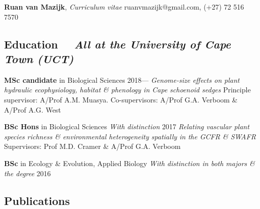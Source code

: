 \documentclass[10pt]{article}
\begin{document}
{\Large
\textbf{Ruan van Mazijk}, \textit{Curriculum vitae} \hfill
  ruanvmazijk@gmail.com, (+27) 72 516 7570
}

\hrulefill

\subsection*{Education %
  ~~{\footnotesize \textmd{\textit{All at the University of Cape Town (UCT)}}}}

\begin{hangparas}{2em}{1}

\textbf{MSc candidate} in Biological Sciences              \hfill 2018--- \break
\textit{Genome-size effects on plant hydraulic ecophysiology, habitat \&
  phenology in Cape schoenoid sedges} \break
Principle supervisor: A/Prof A.M. Muasya. Co-supervisors: A/Prof G.A. Verboom
  \& A/Prof A.G. West

\textbf{BSc Hons} in Biological Sciences {\footnotesize \textit{With distinction
  }}                                                          \hfill 2017 \break
\textit{Relating vascular plant species richness \& environmental heterogeneity
  spatially in the GCFR \& SWAFR} \break
Supervisors: Prof M.D. Cramer \& A/Prof G.A. Verboom

\textbf{BSc} in Ecology \& Evolution, Applied Biology {\footnotesize \textit{
  With distinction in both majors \& the degree}}             \hfill 2016 \break
\hfill

\end{hangparas}

\subsection*{Publications} %
\end{document}

